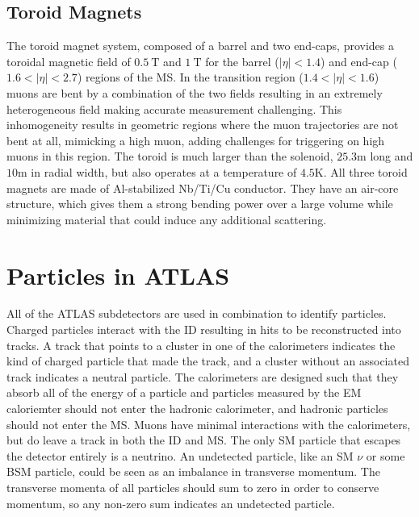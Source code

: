 \subsection{Toroid Magnets}

The toroid magnet system, composed of a barrel and two end-caps, provides a toroidal magnetic field of $0.5~\textrm{T}$ and $1~\textrm{T}$ for the barrel ($|\eta| < 1.4$) and end-cap ($1.6 <|\eta| < 2.7$) regions of the \ac{MS}. In the transition region ($1.4 < |\eta| < 1.6$) muons are bent by a combination of the two fields resulting in an extremely heterogeneous field making accurate measurement challenging. This inhomogeneity results in geometric regions where the muon trajectories are not bent at all, mimicking a high \pt muon, adding challenges for triggering on high \pt muons in this region. The toroid is much larger than the solenoid, $25.3 \textrm{m}$ long and $10 \textrm{m}$ in radial width, but also operates at a temperature of $4.5 \textrm{K}$. All three toroid magnets are made of Al-stabilized Nb/Ti/Cu conductor. They have an air-core structure, which gives them a strong bending power over a large volume while minimizing material that could induce any additional scattering. 


\section{Particles in ATLAS}
All of the \ac{ATLAS} subdetectors are used in combination to identify particles. Charged particles interact with the \ac{ID} resulting in hits to be reconstructed into tracks. A track that points to a cluster in one of the calorimeters indicates the kind of charged particle that made the track, and a cluster without an associated track indicates a neutral particle. The calorimeters are designed such that they absorb all of the energy of a particle and particles measured by the \ac{EM} caloriemter should not enter the hadronic calorimeter, and hadronic particles should not enter the \ac{MS}. Muons have minimal interactions with the calorimeters, but do leave a track in both the \ac{ID} and \ac{MS}. The only \ac{SM} particle that escapes the detector entirely is a neutrino. An undetected particle, like an \ac{SM} $\nu$ or some \ac{BSM} particle, could be seen as an imbalance in transverse momentum. The transverse momenta of all particles should sum to zero in order to conserve momentum, so any non-zero sum indicates an undetected particle.


